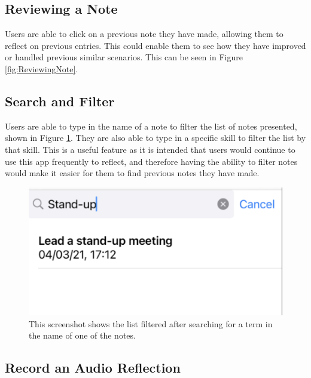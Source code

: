 \documentclass{l4proj}
\begin{document}
\subsection{Reviewing a Note}

Users are able to click on a previous note they have made, allowing them to reflect on previous entries. This could enable them to see how they have improved or handled previous similar scenarios. This can be seen in Figure \ref{fig:ReviewingNote}.

\subsection{Search and Filter}

Users are able to type in the name of a note to filter the list of notes presented, shown in Figure \ref{fig:SearchFilter}. They are also able to type in a specific skill to filter the list by that skill. This is a useful feature as it is intended that users would continue to use this app frequently to reflect, and therefore having the ability to filter notes would make it easier for them to find previous notes they have made.

\begin{figure}[H]
    \centering
    \includegraphics[scale=0.4]{images/SearchFilter.pdf}    
    \caption{This screenshot shows the list filtered after searching for a term in the name of one of the notes.}
    \label{fig:SearchFilter} 
\end{figure}

\subsection{Record an Audio Reflection}
\end{document}
